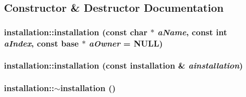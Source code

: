 \subsection{Constructor \& Destructor Documentation}
\hypertarget{classinstallation_a9f8c69df55118f5da0b09a6950739c0f}{
\subsubsection[{installation}]{\setlength{\rightskip}{0pt plus 5cm}installation::installation (const char $\ast$ {\em aName}, \/  const int {\em aIndex}, \/  const {\bf base} $\ast$ {\em aOwner} = {\ttfamily NULL})}}
\label{classinstallation_a9f8c69df55118f5da0b09a6950739c0f}
\hypertarget{classinstallation_aa60509cc5ecb6381642bd4669e42588b}{
\subsubsection[{installation}]{\setlength{\rightskip}{0pt plus 5cm}installation::installation (const {\bf installation} \& {\em ainstallation})}}
\label{classinstallation_aa60509cc5ecb6381642bd4669e42588b}
\hypertarget{classinstallation_a3f90222ba7c0621f1f9ca04569e81d3c}{
\subsubsection[{$\sim$installation}]{\setlength{\rightskip}{0pt plus 5cm}installation::$\sim$installation ()}}
\label{classinstallation_a3f90222ba7c0621f1f9ca04569e81d3c}


